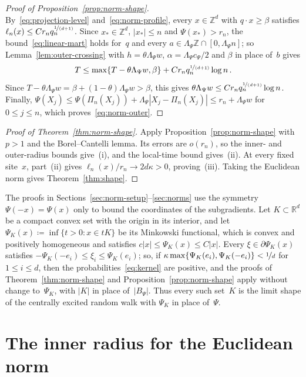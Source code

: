 \documentclass[11pt]{amsart}
\theoremstyle{plain}
\theoremstyle{definition}
\newcommand{\Z}{\mathbb Z}
\newcommand{\R}{\mathbb R}
\newcommand{\drift}{\kappa}
\newcommand{\gauge}{\Psi}
\newcommand{\nf}{\nicefrac}
\numberwithin{equation}{section}
\begin{document}
\begin{proof}[Proof of Proposition~\ref{prop:norm-shape}]
\begin{equation*}
\end{equation*}
By~\eqref{eq:projection-level} and~\eqref{eq:norm-profile}, every $x\in\Z^d$ with $q\cdot x\geq\beta$ satisfies $\ell_n(x)\leq Cr_nq_n^{\nf{1}{(d+1)}}$. Since $x_*\in\Z^d$, $|x_*|\leq n$ and $\gauge(x_*)>r_n$, the bound~\eqref{eq:linear-mart} holds for~$q$ and every $a\in\Lambda_\gauge\Z\cap[0,\Lambda_\gauge n]$; so Lemma~\ref{lem:outer-crossing} with $h=\theta\Lambda_\gauge w$, $\alpha=\Lambda_\gauge c_\gauge/2$ and $\beta$ in place of~$b$ gives
\begin{equation*}
T\leq\max\{T-\theta\Lambda_\gauge w,\beta\}+Cr_nq_n^{\nf{1}{(d+1)}}\log n\, .
\end{equation*}
Since $T-\theta\Lambda_\gauge w=\beta+(1-\theta)\Lambda_\gauge w>\beta$, this gives $\theta\Lambda_\gauge w\leq Cr_nq_n^{\nf{1}{(d+1)}}\log n$. Finally, $\gauge(X_j)\leq\gauge(\Pi_n(X_j))+\Lambda_\gauge|X_j-\Pi_n(X_j)|\leq r_n+\Lambda_\gauge w$ for $0\leq j\leq n$, which proves~\eqref{eq:norm-outer}.
\end{proof}

\begin{proof}[Proof of Theorem~\ref{thm:norm-shape}]
Apply Proposition~\ref{prop:norm-shape} with $p>1$ and the Borel--Cantelli lemma. Its errors are $o(r_n)$, so the inner- and outer-radius bounds give~(i), and the local-time bound gives~(ii). At every fixed site~$x$, part~(ii) gives $\ell_n(x)/r_n\to2d\drift>0$, proving~(iii). Taking the Euclidean norm gives Theorem~\ref{thm:shape}.
\end{proof}

The proofs in Sections~\ref{sec:norm-setup}--\ref{sec:norms} use the symmetry $\gauge(-x)=\gauge(x)$ only to bound the coordinates of the subgradients. Let $K\subset\R^d$ be a compact convex set with the origin in its interior, and let $\gauge_K(x)\coloneqq\inf\{t>0:x\in tK\}$ be its Minkowski functional, which is convex and positively homogeneous and satisfies $c|x|\leq\gauge_K(x)\leq C|x|$. Every $\xi\in\partial\gauge_K(x)$ satisfies $-\gauge_K(-e_i)\leq\xi_i\leq\gauge_K(e_i)$; so, if $\drift\max\{\gauge_K(e_i),\gauge_K(-e_i)\}<\nf1d$ for $1\leq i\leq d$, then the probabilities~\eqref{eq:kernel} are positive, and the proofs of Theorem~\ref{thm:norm-shape} and Proposition~\ref{prop:norm-shape} apply without change to~$\gauge_K$, with $|K|$ in place of~$|B_\gauge|$. Thus every such set~$K$ is the limit shape of the centrally excited random walk with $\gauge_K$ in place of~$\gauge$.

\section{The inner radius for the Euclidean norm}\label{sec:contact}
\end{document}
